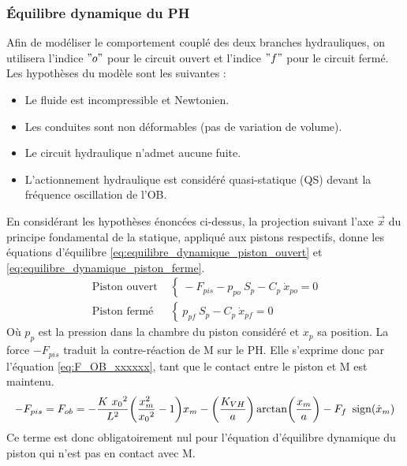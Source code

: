 			\subsubsection{Équilibre dynamique du PH}
			\label{sec:2.4.2.a_Mise en equation}
Afin de modéliser le comportement couplé des deux branches hydrauliques, on utilisera l'indice $"o"$ pour le circuit ouvert et l'indice $"f"$ pour le circuit fermé. Les hypothèses du modèle sont les suivantes :
\begin{itemize}[label=$\circ$]
	\item Le fluide est incompressible et Newtonien.
	\item Les conduites sont non déformables (pas de variation de volume).
	\item Le circuit hydraulique n'admet aucune fuite.
	\item L’actionnement hydraulique est considéré quasi-statique (QS) devant la fréquence oscillation de l’OB.
\end{itemize} 

En considérant les hypothèses énoncées ci-dessus, la projection suivant l'axe $\vec{x}$ du principe fondamental de la statique, appliqué aux pistons respectifs, donne les équations d'équilibre \ref{eq:equilibre_dynamique_piston_ouvert} et \ref{eq:equilibre_dynamique_piston_ferme}.
\begin{align}
\text{Piston ouvert~}& \left\{~
-F_{pis} - p_{po}\ S_{p} - C_{p}\ \dot{x}_{po} = 0
\right.
\label{eq:equilibre_dynamique_piston_ouvert}\\
\text{Piston fermé~}& \left\{~
p_{pf}\ S_{p} - C_{p}\ \dot{x}_{pf} = 0
\right.
\label{eq:equilibre_dynamique_piston_ferme}
\end{align}
Où $p_{p}$ est la pression dans la chambre du piston considéré et $x_p$ sa position. La force $-F_{pis}$ traduit la contre-réaction de M sur le PH. Elle s'exprime donc par l'équation \ref{eq:F_OB_xxxxxx}, tant que le contact entre le piston et M est maintenu.
\begin{equation}
-F_{pis} = F_{ob} = -\frac{K\ {x_0}^2}{L^2}\biggl(\frac{x_m^2}{{x_0}^2} -1\biggr)x_m - \biggl( \frac{K_{VH}}{a} \biggr) \arctan \biggl(\frac{x_m}{a} \biggr) - F_f\ \sign(\dot{x}_m)
\label{eq:F_OB_xxxxxx}
\end{equation}
Ce terme est donc obligatoirement nul pour l'équation d'équilibre dynamique du piston qui n'est pas en contact avec M.
